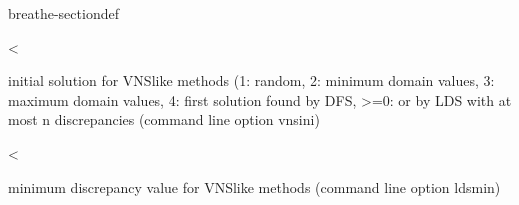 \documentclass[letterpaper,10pt,openany,oneside,english]{sphinxmanual}
\begin{document}
\begin{fulllineitems}
\begin{sphinxuseclass}{breathe-sectiondef}

\begin{fulllineitems}
\label{\detokenize{ref/ref_cpp:_CPPv4N8ToulBar29vnsLDSminE}}\label{\detokenize{ref/ref_cpp:_CPPv3N8ToulBar29vnsLDSminE}}\label{\detokenize{ref/ref_cpp:_CPPv2N8ToulBar29vnsLDSminE}}\label{\detokenize{ref/ref_cpp:ToulBar2::vnsLDSmin__i}}
\pysigstartsignatures
\pysigstartmultiline
{}
\pysigstopmultiline
\pysigstopsignatures
\sphinxAtStartPar
\textless{} 

\sphinxAtStartPar
initial solution for VNS\sphinxhyphen{}like methods (\sphinxhyphen{}1: random, \sphinxhyphen{}2: minimum domain values, \sphinxhyphen{}3: maximum domain values, \sphinxhyphen{}4: first solution found by DFS, \textgreater{}=0: or by LDS with at most n discrepancies (command line option \sphinxhyphen{}vnsini) 

\end{fulllineitems}


\begin{fulllineitems}
\label{\detokenize{ref/ref_cpp:_CPPv4N8ToulBar29vnsLDSmaxE}}\label{\detokenize{ref/ref_cpp:_CPPv3N8ToulBar29vnsLDSmaxE}}\label{\detokenize{ref/ref_cpp:_CPPv2N8ToulBar29vnsLDSmaxE}}\label{\detokenize{ref/ref_cpp:ToulBar2::vnsLDSmax__i}}
\pysigstartsignatures
\pysigstartmultiline
{}
\pysigstopmultiline
\pysigstopsignatures
\sphinxAtStartPar
\textless{} 

\sphinxAtStartPar
minimum discrepancy value for VNS\sphinxhyphen{}like methods (command line option \sphinxhyphen{}ldsmin) 

\end{fulllineitems}



\end{sphinxuseclass}
\end{fulllineitems}
\end{document}
